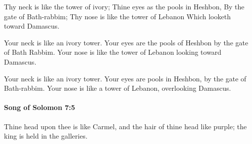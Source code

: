 			\begin{versebox}
					\item[BHS] 
					\item[LXX] 
					\item[ASV] Thy neck is like the tower of ivory; Thine eyes as the pools in Heshbon, By the gate of Bath-rabbim; Thy nose is like the tower of Lebanon Which looketh toward Damascus.
					\item[NIV] Your neck is like an ivory tower. Your eyes are the pools of Heshbon by the gate of Bath Rabbim. Your nose is like the tower of Lebanon looking toward Damascus.
					\item[NRSV] Your neck is like an ivory tower. Your eyes are pools in Heshbon, by the gate of Bath-rabbim. Your nose is like a tower of Lebanon, overlooking Damascus.
			\end{versebox}

		\paragraph{Song of Solomon 7:5} %
			\label{SONGOFSOLOMON-7-5}

			Thine head upon thee is like Carmel, and the hair of thine head like purple; the king is held in the galleries.

